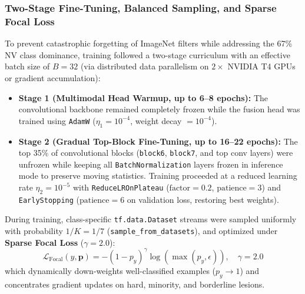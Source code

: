 \documentclass[11pt,a4paper]{article}
\begin{document}
\subsubsection{Two-Stage Fine-Tuning, Balanced Sampling, and Sparse Focal Loss}
To prevent catastrophic forgetting of ImageNet filters while addressing the 67\% NV class dominance, training followed a two-stage curriculum with an effective batch size of $B = 32$ (via distributed data parallelism on $2\times$ NVIDIA T4 GPUs or gradient accumulation):
\begin{itemize}
    \item \textbf{Stage 1 (Multimodal Head Warmup, up to 6--8 epochs):} The convolutional backbone remained completely frozen while the fusion head was trained using \texttt{AdamW} ($\eta_1 = 10^{-4}$, weight decay $= 10^{-4}$).
    \item \textbf{Stage 2 (Gradual Top-Block Fine-Tuning, up to 16--22 epochs):} The top 35\% of convolutional blocks (\texttt{block6}, \texttt{block7}, and top conv layers) were unfrozen while keeping all \texttt{BatchNormalization} layers frozen in inference mode to preserve moving statistics. Training proceeded at a reduced learning rate $\eta_2 = 10^{-5}$ with \texttt{ReduceLROnPlateau} ($\text{factor}=0.2$, $\text{patience}=3$) and \texttt{EarlyStopping} ($\text{patience}=6$ on validation loss, restoring best weights).
\end{itemize}
During training, class-specific \texttt{tf.data.Dataset} streams were sampled uniformly with probability $1/K = 1/7$ (\texttt{sample\_from\_datasets}), and optimized under \textbf{Sparse Focal Loss} \cite{lin2017} ($\gamma = 2.0$):
\begin{equation}
    \mathcal{L}_{\text{Focal}}(y, \mathbf{p}) = -\left(1 - p_y\right)^{\gamma} \log\!\left(\max(p_y, \epsilon)\right), \quad \gamma = 2.0
\end{equation}
which dynamically down-weights well-classified examples ($p_y \to 1$) and concentrates gradient updates on hard, minority, and borderline lesions.
\end{document}
